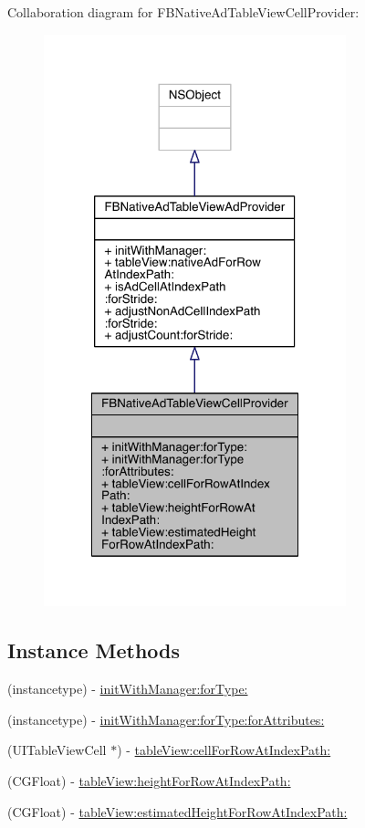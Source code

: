 Collaboration diagram for F\-B\-Native\-Ad\-Table\-View\-Cell\-Provider\-:
\nopagebreak
\begin{figure}[H]
\begin{center}
\leavevmode
\includegraphics[width=248pt]{interface_f_b_native_ad_table_view_cell_provider__coll__graph}
\end{center}
\end{figure}
\subsection*{Instance Methods}
\begin{DoxyCompactItemize}
\item 
(instancetype) -\/ \hyperlink{interface_f_b_native_ad_table_view_cell_provider_abec48dac2d107c6e6ae2248274fb4cb4}{init\-With\-Manager\-:for\-Type\-:}
\item 
(instancetype) -\/ \hyperlink{interface_f_b_native_ad_table_view_cell_provider_a8af26c558eb2151d384e52528374d057}{init\-With\-Manager\-:for\-Type\-:for\-Attributes\-:}
\item 
(U\-I\-Table\-View\-Cell $\ast$) -\/ \hyperlink{interface_f_b_native_ad_table_view_cell_provider_a58ca9b665cb351a303dfd0b274fd9d28}{table\-View\-:cell\-For\-Row\-At\-Index\-Path\-:}
\item 
(C\-G\-Float) -\/ \hyperlink{interface_f_b_native_ad_table_view_cell_provider_afc2cdceb47109e42beacf4eb0ebd56cd}{table\-View\-:height\-For\-Row\-At\-Index\-Path\-:}
\item 
(C\-G\-Float) -\/ \hyperlink{interface_f_b_native_ad_table_view_cell_provider_a340a12052bafe499391911874000550b}{table\-View\-:estimated\-Height\-For\-Row\-At\-Index\-Path\-:}
\end{DoxyCompactItemize}


